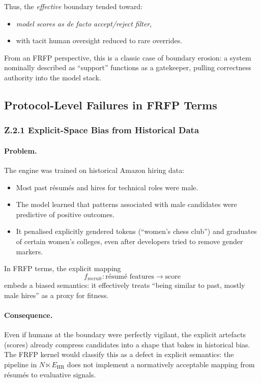 Thus, the \emph{effective} boundary tended toward:

\begin{itemize}
  \item \emph{model scores as de facto accept/reject filter},
  \item with tacit human oversight reduced to rare overrides.
\end{itemize}

From an FRFP perspective, this is a classic case of boundary erosion:
a system nominally described as ``support'' functions as a gatekeeper,
pulling correctness authority into the model stack.

\subsection{Protocol-Level Failures in FRFP Terms}

\subsubsection*{Z.2.1 Explicit-Space Bias from Historical Data}

\paragraph{Problem.}
The engine was trained on historical Amazon hiring data:

\begin{itemize}
  \item Most past résumés and hires for technical roles were male.
  \item The model learned that patterns associated with male candidates
        were predictive of positive outcomes.
  \item It penalised explicitly gendered tokens (``women’s chess club'')
        and graduates of certain women’s colleges, even after developers
        tried to remove gender markers.
\end{itemize}

In FRFP terms, the explicit mapping
\[
  f_{\mathrm{recruit}} : \text{résumé features} \to \text{score}
\]
embeds a biased semantics: it effectively treats ``being similar to past,
mostly male hires'' as a proxy for fitness.

\paragraph{Consequence.}
Even if humans at the boundary were perfectly vigilant, the explicit artefacts
(scores) already compress candidates into a shape that bakes in historical
bias.
The FRFP kernel would classify this as a defect in explicit semantics:
the pipeline in \(N \ltimes E_{\mathrm{HR}}\) does not implement a
normatively acceptable mapping from résumés to evaluative signals.

